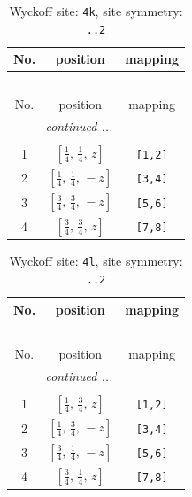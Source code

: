 \documentclass[fleqn,8pt]{jsarticle}
\begin{document}
\renewcommand{\arraystretch}{1.2}
\begin{longtable}{ccc}
\caption{Wyckoff site: {\tt 4k}, site symmetry: {\tt ..2}}
 \\
 \hline \hline
No. & position & mapping \\ \hline \endfirsthead

\multicolumn{2}{l}{\tablename\ \thetable{}} \\
 \hline \hline
No. & position & mapping \\ \hline \endhead

 \hline \hline
\multicolumn{2}{r}{\footnotesize\it continued ...} \\ \endfoot

 \hline \hline
\multicolumn{2}{r}{} \\ \endlastfoot

1 & $\left[ \frac{1}{4},\, \frac{1}{4},\, z \right]$ & {\tt [1,2]} \\ \hline
2 & $\left[ \frac{1}{4},\, \frac{1}{4},\, - z \right]$ & {\tt [3,4]} \\ \hline
3 & $\left[ \frac{3}{4},\, \frac{3}{4},\, - z \right]$ & {\tt [5,6]} \\ \hline
4 & $\left[ \frac{3}{4},\, \frac{3}{4},\, z \right]$ & {\tt [7,8]} \\
\end{longtable}
\renewcommand{\arraystretch}{1.2}
\begin{longtable}{ccc}
\caption{Wyckoff site: {\tt 4l}, site symmetry: {\tt ..2}}
 \\
 \hline \hline
No. & position & mapping \\ \hline \endfirsthead

\multicolumn{2}{l}{\tablename\ \thetable{}} \\
 \hline \hline
No. & position & mapping \\ \hline \endhead

 \hline \hline
\multicolumn{2}{r}{\footnotesize\it continued ...} \\ \endfoot

 \hline \hline
\multicolumn{2}{r}{} \\ \endlastfoot

1 & $\left[ \frac{1}{4},\, \frac{3}{4},\, z \right]$ & {\tt [1,2]} \\ \hline
2 & $\left[ \frac{1}{4},\, \frac{3}{4},\, - z \right]$ & {\tt [3,4]} \\ \hline
3 & $\left[ \frac{3}{4},\, \frac{1}{4},\, - z \right]$ & {\tt [5,6]} \\ \hline
4 & $\left[ \frac{3}{4},\, \frac{1}{4},\, z \right]$ & {\tt [7,8]} \\
\end{longtable}
\end{document}
